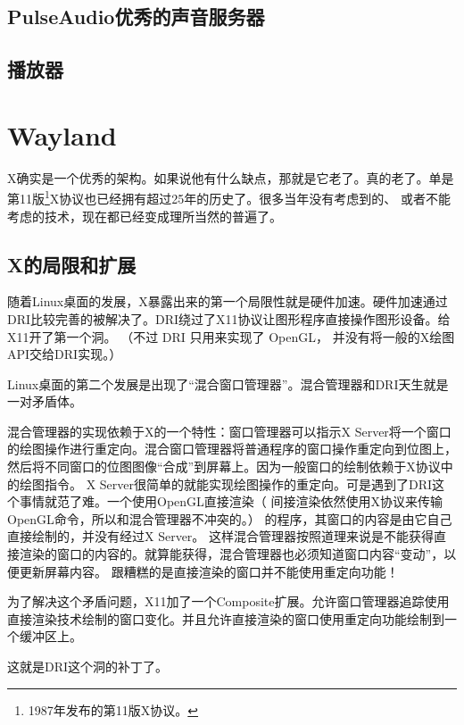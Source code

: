 \documentclass[amstex,twoside]{ctexbook}
\newenvironment{insertnote}{ \ttfamily\CJKfamily{KaiTi} }{\vskip 0.5cm }
\begin{document}
\subsection{PulseAudio优秀的声音服务器}
\subsection{播放器}

\section{Wayland}

X确实是一个优秀的架构。如果说他有什么缺点，那就是它老了。真的老了。单是第11版\footnote{1987年发布的第11版X协议。}X协议也已经拥有超过25年的历史了。很多当年没有考虑到的、
或者不能考虑的技术，现在都已经变成理所当然的普遍了。

\subsection{X的局限和扩展}

随着Linux桌面的发展，X暴露出来的第一个局限性就是硬件加速。硬件加速通过DRI比较完善的被解决了。DRI绕过了X11协议让图形程序直接操作图形设备。给X11开了第一个洞。
（不过 DRI 只用来实现了 OpenGL， 并没有将一般的X绘图API交给DRI实现。）

Linux桌面的第二个发展是出现了“混合窗口管理器”。混合管理器和DRI天生就是一对矛盾体。

\begin{insertnote}

混合管理器的实现依赖于X的一个特性：窗口管理器可以指示X Server将一个窗口的绘图操作进行重定向。混合窗口管理器将普通程序的窗口操作重定向到位图上，然后将不同窗口的位图图像“合成”到屏幕上。因为一般窗口的绘制依赖于X协议中的绘图指令。
X Server很简单的就能实现绘图操作的重定向。可是遇到了DRI这个事情就范了难。一个使用OpenGL直接渲染（ 间接渲染依然使用X协议来传输OpenGL命令，所以和混合管理器不冲突的。）
的程序，其窗口的内容是由它自己直接绘制的，并没有经过X Server。 这样混合管理器按照道理来说是不能获得直接渲染的窗口的内容的。就算能获得，混合管理器也必须知道窗口内容“变动”，以便更新屏幕内容。
跟糟糕的是直接渲染的窗口并不能使用重定向功能！
\end{insertnote}

为了解决这个矛盾问题，X11加了一个Composite扩展。允许窗口管理器追踪使用直接渲染技术绘制的窗口变化。并且允许直接渲染的窗口使用重定向功能绘制到一个缓冲区上。

这就是DRI这个洞的补丁了。
\end{document}
